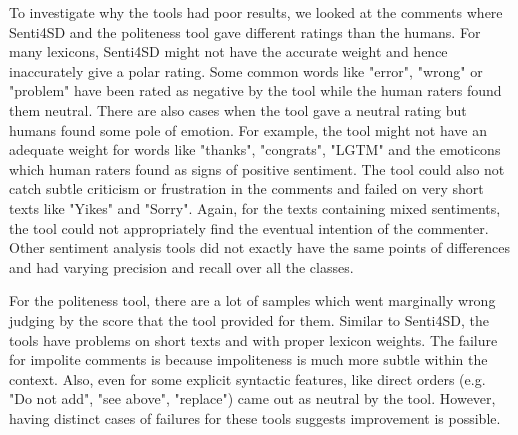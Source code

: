 To investigate why the tools had poor results, 
we looked at the comments where
Senti4SD and the politeness tool
gave different ratings than the humans.
For many lexicons, 
Senti4SD might not have the accurate weight 
and hence inaccurately give a polar rating. 
Some common words like "error", "wrong" or "problem" 
have been rated as negative by the tool 
while the human raters found them neutral. 
There are also cases when the tool gave a neutral rating 
but humans found some pole of emotion. 
For example, the tool might not have an adequate weight 
for words like "thanks", "congrats", "LGTM" 
and the emoticons which human raters found 
as signs of positive sentiment. 
The tool could also not catch 
subtle criticism or frustration in the comments and 
failed on very short texts like 
"Yikes" and "Sorry". 
Again, for the texts containing mixed sentiments, 
the tool could not appropriately find 
the eventual intention of the commenter. 
Other sentiment analysis tools did not 
exactly have the same points of differences 
and had varying precision and recall over all the classes. 

For the politeness tool, 
there are a lot of samples 
which went marginally wrong 
judging by the score that the tool provided for them.
Similar to Senti4SD, the tools have problems
on short texts and
with proper lexicon weights. 
The failure for impolite comments is because 
impoliteness is much more subtle within the context. 
Also, even for some explicit syntactic features, 
like direct orders (e.g. "Do not add", "see above", "replace") 
came out as neutral by the tool. 
However, having distinct cases of failures for these tools 
suggests improvement is possible.

